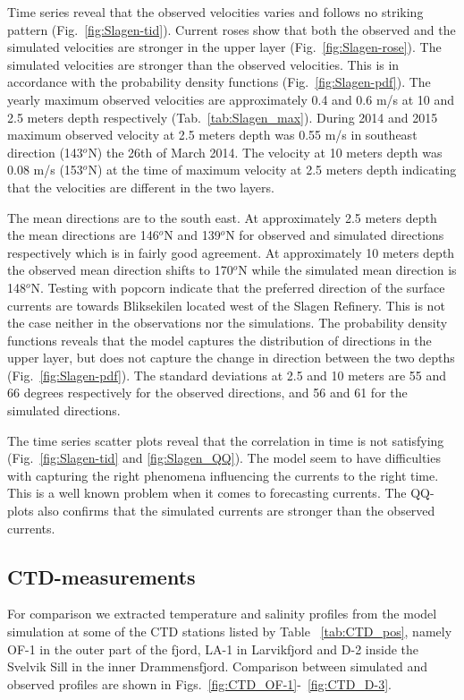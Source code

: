 Time series reveal that the observed velocities varies and follows no striking pattern (Fig.~\ref{fig:Slagen-tid}).
Current roses show that both the observed and the simulated velocities are stronger in the upper layer (Fig.~\ref{fig:Slagen-rose}). The simulated velocities are stronger than the observed velocities. This is in accordance with the probability density functions (Fig.~\ref{fig:Slagen-pdf}). The yearly maximum observed velocities are approximately 0.4 and 0.6 m/s at 10 and 2.5 meters depth respectively (Tab.~\ref{tab:Slagen_max}). During 2014 and 2015 maximum observed velocity at 2.5 meters depth was 0.55 m/s in southeast direction (143$^o$N) the 26th of March 2014. The velocity at 10 meters depth was 0.08 m/s (153$^o$N) at the time of maximum velocity at 2.5 meters depth indicating that the velocities are different in the two layers.

The mean directions are to the south east. At approximately 2.5 meters depth the mean directions are 146$^o$N and 139$^o$N for observed and simulated directions respectively which is in fairly good agreement. At approximately 10 meters depth the observed mean direction shifts to 170$^o$N while the simulated mean direction is 148$^o$N. 
Testing with popcorn indicate that the preferred direction of the surface currents are towards Bliksekilen located west of the Slagen Refinery. This is not the case neither in the observations nor the simulations.
The probability density functions reveals that the model captures the distribution of directions in the upper layer, but does not capture the change in direction between the two depths (Fig.~\ref{fig:Slagen-pdf}). The standard deviations at 2.5 and 10 meters are 55 and 66 degrees respectively for the observed directions, and 56 and 61 for the simulated directions.

The time series scatter plots reveal that the correlation in time is not satisfying (Fig.~\ref{fig:Slagen-tid} and \ref{fig:Slagen_QQ}). The model seem to have difficulties with capturing the right phenomena influencing the currents to the right time. This is a well known problem when it comes to forecasting currents. The QQ-plots also confirms that the simulated currents are stronger than the observed currents. 

\clearpage
\subsection{CTD-measurements}
\label{subsec:CTDe}
For comparison we extracted temperature and salinity profiles from the model simulation at some of the CTD stations listed by Table ~\ref{tab:CTD_pos}, namely OF-1 in the outer part of the fjord, LA-1 in Larvikfjord and D-2 inside the Svelvik Sill in the inner Drammensfjord. Comparison between simulated and observed profiles are shown in Figs.~\ref{fig:CTD_OF-1}-~\ref{fig:CTD_D-3}. 

